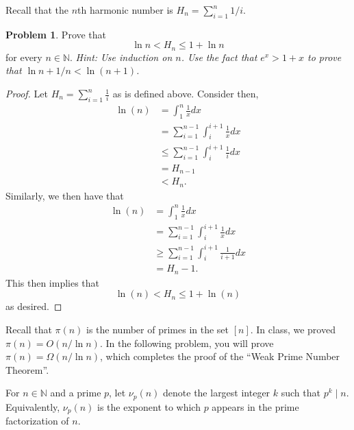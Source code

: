\documentclass[11pt, letter]{amsart}
\theoremstyle{definition}
\newtheorem{problem}{Problem}[]
\begin{document}
\clearpage
  Recall that the $n$th harmonic number is $H_n = \sum_{i=1}^n 1 / i$.
\begin{problem}
  Prove that
  \begin{equation*}
    \ln n < H_n \leq 1 + \ln n
  \end{equation*}
  for every $n \in \mathbb N$.
  \textit{Hint: Use induction on $n$.  Use the fact that $e^x > 1 + x$ to prove that $\ln n + 1 / n < \ln (n + 1)$.}
\end{problem}

\begin{proof}
Let $H_n = \sum_{i = 1}^n \frac{1}{i}$ as is defined above. Consider then,
\begin{align*}
    \ln(n) &= \int_1^n\frac{1}{x}dx\\
    &= \sum_{i = 1}^{n - 1}\int_i^{i + 1}\frac{1}{x}dx\\
    &\leq \sum_{i = 1}^{n - 1}\int_i^{i + 1}\frac{1}{i}dx\\
    &= H_{n - 1}\\
    &< H_n.
\end{align*} Similarly, we then have that 
\begin{align*}
    \ln(n) &= \int_1^n\frac{1}{x}dx\\
    &= \sum_{i = 1}^{n - 1}\int_i^{i + 1}\frac{1}{x}dx\\
    &\geq \sum_{i = 1}^{n - 1}\int_i^{i + 1}\frac{1}{i + 1}dx\\
    &= H_n - 1.
\end{align*} This then implies that
\begin{equation*}
    \ln(n) < H_n \leq 1 + \ln(n)
\end{equation*}
as desired.
\end{proof}

\clearpage
Recall that $\pi(n)$ is the number of primes in the set $[n]$.  In class, we proved $\pi(n) = O(n / \ln n)$.  In the following problem, you will prove $\pi(n) = \Omega(n / \ln n)$, which completes the proof of the ``Weak Prime Number Theorem''.

For $n \in \mathbb N$ and a prime $p$, let $\nu_p(n)$ denote the largest integer $k$ such that $p^k \mid n$.  Equivalently, $\nu_p(n)$ is the exponent to which $p$ appears in the prime factorization of $n$.    
\end{document}
